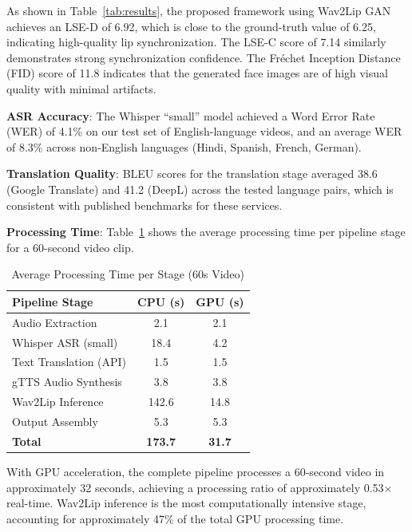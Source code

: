 \documentclass[conference]{IEEEtran}
\begin{document}
As shown in Table~\ref{tab:results}, the proposed framework using Wav2Lip GAN achieves an LSE-D of 6.92, which is close to the ground-truth value of 6.25, indicating high-quality lip synchronization. The LSE-C score of 7.14 similarly demonstrates strong synchronization confidence. The Fr\'echet Inception Distance (FID) score of 11.8 indicates that the generated face images are of high visual quality with minimal artifacts.

\textbf{ASR Accuracy}: The Whisper ``small'' model achieved a Word Error Rate (WER) of 4.1\% on our test set of English-language videos, and an average WER of 8.3\% across non-English languages (Hindi, Spanish, French, German).

\textbf{Translation Quality}: BLEU scores for the translation stage averaged 38.6 (Google Translate) and 41.2 (DeepL) across the tested language pairs, which is consistent with published benchmarks for these services.

\textbf{Processing Time}: Table~\ref{tab:timing} shows the average processing time per pipeline stage for a 60-second video clip.

\begin{table}[htbp]
\caption{Average Processing Time per Stage (60s Video)}
\begin{center}
\begin{tabular}{lcc}
\toprule
\textbf{Pipeline Stage} & \textbf{CPU (s)} & \textbf{GPU (s)} \\
\midrule
Audio Extraction & 2.1 & 2.1 \\
Whisper ASR (small) & 18.4 & 4.2 \\
Text Translation (API) & 1.5 & 1.5 \\
gTTS Audio Synthesis & 3.8 & 3.8 \\
Wav2Lip Inference & 142.6 & 14.8 \\
Output Assembly & 5.3 & 5.3 \\
\midrule
\textbf{Total} & \textbf{173.7} & \textbf{31.7} \\
\bottomrule
\end{tabular}
\label{tab:timing}
\end{center}
\end{table}

With GPU acceleration, the complete pipeline processes a 60-second video in approximately 32 seconds, achieving a processing ratio of approximately 0.53$\times$ real-time. Wav2Lip inference is the most computationally intensive stage, accounting for approximately 47\% of the total GPU processing time.
\end{document}
